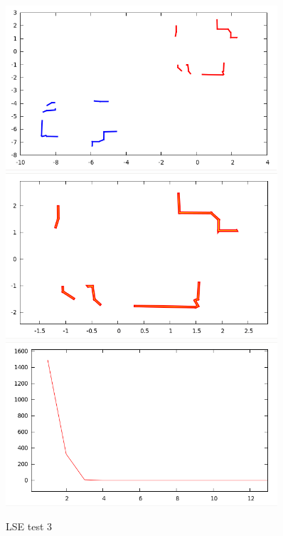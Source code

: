 \documentclass[a4paper, onecolumn]{report}
\begin{document}
\begin{figure}[htbp]
\centering
\includegraphics[width=0.9\textwidth]{images/foto_test/-5_7_-4.7124/before_after.png}
\includegraphics[width=0.9\textwidth]{images/foto_test/-5_7_-4.7124/result.png}
\includegraphics[width=0.9\textwidth]{images/foto_test/-5_7_-4.7124/chi_new.png}
\caption{LSE test 3}
\end{figure}
\end{document}
